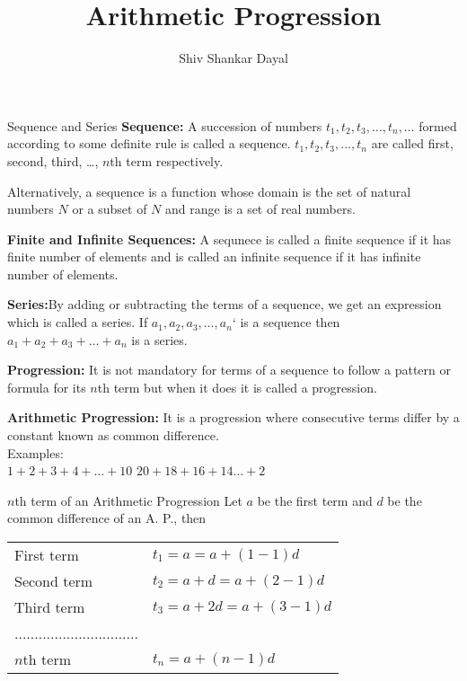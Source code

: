 \documentclass[aspectratio=1610,8pt]{beamer}
\title{Arithmetic Progression}
\author[Shiv Shankar Dayal]
       {
	       Shiv Shankar Dayal
       }
\begin{document}
\begin{frame}
       \titlepage
\end{frame}

\begin{frame}{Sequence and Series}
  \textbf{Sequence:} A succession of numbers $t_1, t_2, t_3, \ldots ,t_n,
  \ldots$ formed according to some definite rule is called a sequence. $t_1,
  t_2, t_3, \ldots, t_n$ are called first, second, third, \ldots, $n$th term
  respectively.

  Alternatively, a sequence is a function whose domain is the set of natural
  numbers $N$ or a subset of $N$ and range is a set of real numbers.

  \textbf{Finite and Infinite Sequences:} A sequnece is called a finite
  sequence if it has finite number of elements and is called an infinite
  sequence if it has infinite number of elements.

  \textbf{Series:}By adding or subtracting the terms of a sequence, we get an
  expression which is called a series. If $a_1, a_2, a_3, \ldots, a_n$` is a
  sequence then $a_1 + a_2 + a_3 + \ldots +a_n$ is a series.

  \textbf{Progression:} It is not mandatory for terms of a sequence to follow a
  pattern or formula for its $n$th term but when it does it is called a
  progression.

  \textbf{Arithmetic Progression:} It is a progression where consecutive terms
  differ by a constant known as common difference.\\
  Examples: \\$1 + 2 + 3 + 4 + \ldots + 10$\linebreak
  $20 + 18 + 16 + 14 \ldots + 2$
\end{frame}

\begin{frame}{$n$th term of an Arithmetic Progression}
  Let $a$ be the first term and $d$ be the common difference of an A. P., then

  \vspace*{.5cm}
  \begin{tabular}{ll}
  First term &$t_1 = a = a + (1 - 1)d$\\
  Second term &$t_2 = a + d = a + (2 - 1)d$\\
  Third term &$t_3 = a + 2d = a + (3 - 1)d$\\
  ...............................&\\
  $n$th term &$t_n = a + (n - 1)d$
  \end{tabular}
\end{frame}
\end{document}
